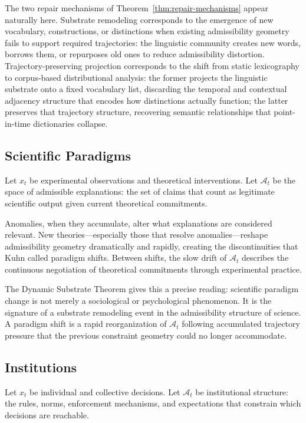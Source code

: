 \documentclass[12pt,a4paper]{article}
\begin{document}
The two repair mechanisms of Theorem~\ref{thm:repair-mechanisms} appear naturally here. Substrate remodeling corresponds to the emergence of new vocabulary, constructions, or distinctions when existing admissibility geometry fails to support required trajectories: the linguistic community creates new words, borrows them, or repurposes old ones to reduce admissibility distortion. Trajectory-preserving projection corresponds to the shift from static lexicography to corpus-based distributional analysis: the former projects the linguistic substrate onto a fixed vocabulary list, discarding the temporal and contextual adjacency structure that encodes how distinctions actually function; the latter preserves that trajectory structure, recovering semantic relationships that point-in-time dictionaries collapse.

\subsection{Scientific Paradigms}

Let $x_t$ be experimental observations and theoretical interventions. Let $\mathcal{A}_t$ be the space of admissible explanations: the set of claims that count as legitimate scientific output given current theoretical commitments.

Anomalies, when they accumulate, alter what explanations are considered relevant. New theories---especially those that resolve anomalies---reshape admissibility geometry dramatically and rapidly, creating the discontinuities that Kuhn called paradigm shifts. Between shifts, the slow drift of $\mathcal{A}_t$ describes the continuous negotiation of theoretical commitments through experimental practice.

The Dynamic Substrate Theorem gives this a precise reading: scientific paradigm change is not merely a sociological or psychological phenomenon. It is the signature of a substrate remodeling event in the admissibility structure of science. A paradigm shift is a rapid reorganization of $\mathcal{A}_t$ following accumulated trajectory pressure that the previous constraint geometry could no longer accommodate.

\subsection{Institutions}

Let $x_t$ be individual and collective decisions. Let $\mathcal{A}_t$ be institutional structure: the rules, norms, enforcement mechanisms, and expectations that constrain which decisions are reachable.
\end{document}
